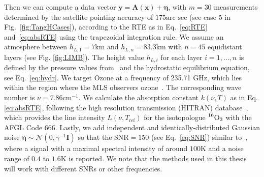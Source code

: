Then we can compute a data vector $\bm{y} = \bm{A}(\bm{x}) + \bm{\eta} $, with $m = 30$ measurements determined by the satellite pointing accuracy of $175\text{arc sec}$ (see case 5 in Fig.~\ref{fig:TangHCases}), according to the RTE as in Eq.~\ref{eq:RTE} and~\ref{eq:absRTE} using the trapezoidal integration rule.
We assume an atmosphere between $h_{L,1}=7$km and $h_{L,n} = 83.3$km with $n = 45$ equidistant layers (see Fig. \ref{fig:LIMB}).
The height value $h_{L,i}$ for each layer $i = 1,\dots, n$ is defined by the pressure values from~\cite{MLSdata} and the hydrostatic equilibrium equation, see Eq.~\ref{eq:hydr}.
We target Ozone at a frequency of 235.71 GHz, which lies within the region where the MLS observers ozone~\cite{livesey2008ozonecarbonmono, waters2006earth}.
The corresponding wave number is $\nu = 7.86\text{cm}^{-1}$.
We calculate the absorption constant $k(\nu,T)$ as in Eq. \ref{eq:absRTE}, following the high resolution transmission (HITRAN) database~\cite{gordon2022hitran2020}, which provides the line intensity $L(\nu,T_{\text{ref}})$ for the isotopologue $\prescript{16}{}{\text{O}}_3$ with the AFGL Code 666.
Lastly, we add independent and identically-distributed Gaussian noise $\bm{\eta} \sim \mathcal{N}(0,\gamma^{-1} \bm{I})$ so that the $\text{SNR}=150$ (see Eq.~\ref{eq:SNR}) similar to~\cite{Froidevaux2008snrozone}, where a signal with a maximal spectral intensity of around $100\text{K}$ and a noise range of $0.4$ to $1.6\text{K}$ is reported.
We note that the methods used in this thesis will work with different SNRs or other frequencies.

